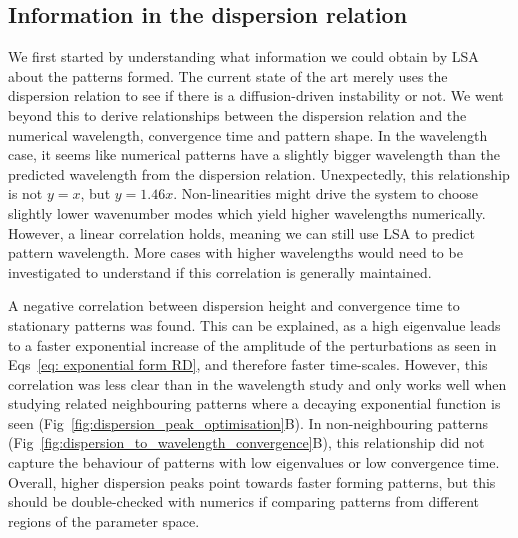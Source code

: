\subsection*{Information in the dispersion relation}
We first started by understanding what information we could obtain by LSA about the patterns formed.
The current state of the art merely uses the dispersion relation to see if there is a diffusion-driven instability or not.
We went beyond this to derive relationships between the dispersion relation and the numerical wavelength, convergence time and pattern shape.
In the wavelength case, it seems like numerical patterns have a slightly bigger wavelength than the predicted wavelength from the dispersion relation.
Unexpectedly, this relationship is not $y=x$, but $y=1.46x$.
Non-linearities might drive the system to choose slightly lower wavenumber modes which yield higher wavelengths numerically.
However, a linear correlation holds, meaning we can still use LSA to predict pattern wavelength.
More cases with higher wavelengths would need to be investigated to understand if this correlation is generally maintained.

A negative correlation between dispersion height and convergence time to stationary patterns was found.
This can be explained, as a high eigenvalue leads to a faster exponential increase of the amplitude of the perturbations as seen in Eqs~\ref{eq: exponential form RD}, and therefore faster time-scales.
However, this correlation was less clear than in the wavelength study and only works well when studying related neighbouring patterns where a decaying exponential function is seen (Fig~\ref{fig:dispersion_peak_optimisation}B).
In non-neighbouring patterns (Fig~\ref{fig:dispersion_to_wavelength_convergence}B), this relationship did not capture the behaviour of patterns with low eigenvalues or low convergence time.
Overall, higher dispersion peaks point towards faster forming patterns, but this should be double-checked with numerics if comparing patterns from different regions of the parameter space.

